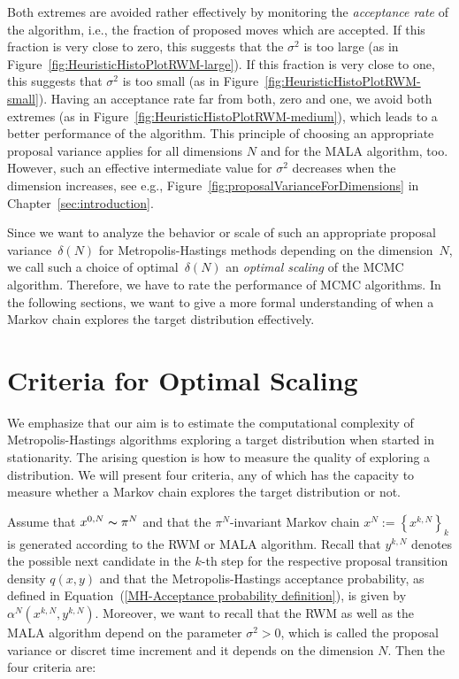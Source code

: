 Both extremes are avoided rather effectively by  monitoring the \textit{acceptance rate} of the algorithm, i.e., the fraction of proposed moves which are accepted. If this fraction is very close to zero, this suggests that the $ \sigma^2 $ is too large (as in Figure~\ref{fig:HeuristicHistoPlotRWM-large}). If this fraction is very close to one, this suggests that $ \sigma^2 $ is too small (as in Figure~\ref{fig:HeuristicHistoPlotRWM-small}). Having an acceptance rate far from both, zero and one, we avoid both extremes (as in Figure~\ref{fig:HeuristicHistoPlotRWM-medium}), which leads to a better performance of the algorithm. This principle of choosing an appropriate proposal variance applies for all dimensions $N$ and for the MALA algorithm, too. However, such an effective intermediate value for $\sigma^2$ decreases when the dimension increases, see e.g., Figure~\ref{fig:proposalVarianceForDimensions} in Chapter~\ref{sec:introduction}. 


Since we want to analyze the behavior or scale of such an appropriate proposal variance~$\delta(N)$ for Metropolis-Hastings methods depending on the dimension~$N$, we call such a choice of optimal~$\delta(N)$ an \textit{optimal scaling} of the MCMC algorithm. Therefore, we have to rate the performance of MCMC algorithms. In the following sections, we want to give a more formal understanding of when a Markov chain explores the target distribution effectively.





\section{Criteria for Optimal Scaling}
\label{CC:Criteria}

We emphasize that our aim is to estimate the computational complexity of Metropolis-Hastings algorithms exploring a target distribution when started in stationarity. The arising question is how to measure the quality of exploring a distribution. We will present four criteria, any of which has the capacity to measure whether a Markov chain explores the target distribution or not. 

Assume that $ x^{0,N}  \thicksim \pi^{N} $ and that the $\pi^{N}$-invariant Markov chain $ x^{N} := \left\{ x^{k,N}\right\}_k $ is generated according to the RWM or MALA algorithm. Recall that $ y^{k,N} $ denotes the possible next candidate in the $k$-th step for the respective proposal transition density $ q(x,y) $ and that the Metropolis-Hastings acceptance probability, as defined in Equation~(\ref{MH-Acceptance probability definition}), is given by $ \alpha^{N}\left(x^{k,N},y^{k,N}\right) $. Moreover, we want to recall that the RWM as well as the MALA algorithm depend on the parameter $ \sigma^2 > 0 $, which is called the proposal variance or discret time increment and it depends on the dimension $N$. Then the four criteria are:

